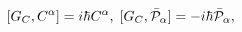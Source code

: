 \begin{equation}
\lbrack G_{C},C^{\alpha}]=i\hbar C^{\alpha},\;[G_{C},\bar{{\cal P}}%
_{\alpha}]=-i\hbar\bar{{\cal P}}_{\alpha},\label{2.3}%
\end{equation}

